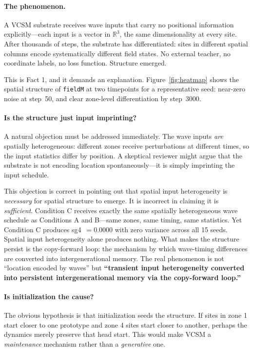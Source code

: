 \documentclass[11pt,twocolumn]{article}
\begin{document}
\paragraph{The phenomenon.}
A VCSM substrate receives wave inputs that carry no positional information
explicitly---each input is a vector in $\mathbb{R}^3$, the same dimensionality
at every site. After thousands of steps, the substrate has differentiated: sites
in different spatial columns encode systematically different field states. No
external teacher, no coordinate labels, no loss function. Structure emerged.

This is Fact 1, and it demands an explanation.
Figure~\ref{fig:heatmap} shows the spatial structure of \texttt{fieldM}
at two timepoints for a representative seed: near-zero noise at step~50,
and clear zone-level differentiation by step~3000.

\paragraph{Is the structure just input imprinting?}
A natural objection must be addressed immediately. The wave inputs \emph{are}
spatially heterogeneous: different zones receive perturbations at different times,
so the input statistics differ by position. A skeptical reviewer might argue that
the substrate is not encoding location spontaneously---it is simply imprinting
the input schedule.

This objection is correct in pointing out that spatial input heterogeneity is
\emph{necessary} for spatial structure to emerge. It is incorrect in claiming
it is \emph{sufficient}. Condition C receives exactly the same spatially
heterogeneous wave schedule as Conditions A and B---same zones, same timing,
same statistics. Yet Condition C produces sg4~$= 0.0000$ with zero variance
across all 15 seeds. Spatial input heterogeneity alone produces nothing.
What makes the structure persist is the copy-forward loop: the mechanism by
which wave-timing differences are converted into intergenerational memory.
The real phenomenon is not ``location encoded by waves'' but
\textbf{``transient input heterogeneity converted into persistent
intergenerational memory via the copy-forward loop.''}

\paragraph{Is initialization the cause?}
The obvious hypothesis is that initialization seeds the structure. If sites in
zone 1 start closer to one prototype and zone 4 sites start closer to another,
perhaps the dynamics merely preserve that head start. This would make VCSM
a \emph{maintenance} mechanism rather than a \emph{generative} one.
\end{document}
